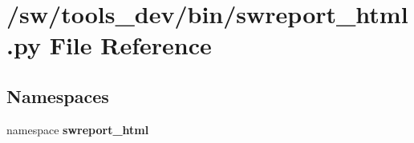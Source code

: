 \section{/sw/tools\_\-dev/bin/swreport\_\-html.py File Reference}
\label{swreport__html_8py}
\subsection*{Namespaces}
\begin{CompactItemize}
\item 
namespace {\bf swreport\_\-html}
\end{CompactItemize}
